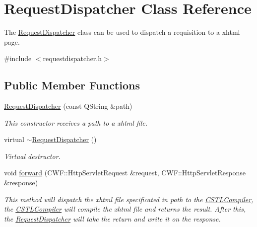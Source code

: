 \hypertarget{class_request_dispatcher}{}\section{Request\+Dispatcher Class Reference}
\label{class_request_dispatcher}


The \mbox{\hyperlink{class_request_dispatcher}{Request\+Dispatcher}} class can be used to dispatch a requisition to a xhtml page.  




{\ttfamily \#include $<$requestdispatcher.\+h$>$}

\subsection*{Public Member Functions}
\begin{DoxyCompactItemize}
\item 
\mbox{\hyperlink{class_request_dispatcher_accb486106fd9d814d44222594a174fbb}{Request\+Dispatcher}} (const Q\+String \&path)
\begin{DoxyCompactList}\small\item\em This constructor receives a path to a xhtml file. \end{DoxyCompactList}\item 
\mbox{\label{class_request_dispatcher_a1b09805ab31a0f96d9823a2bf9de3771}} 
virtual \mbox{\hyperlink{class_request_dispatcher_a1b09805ab31a0f96d9823a2bf9de3771}{$\sim$\+Request\+Dispatcher}} ()
\begin{DoxyCompactList}\small\item\em Virtual destructor. \end{DoxyCompactList}\item 
void \mbox{\hyperlink{class_request_dispatcher_aa3ccc7d3debc6555da0f6e437cfb036e}{forward}} (C\+W\+F\+::\+Http\+Servlet\+Request \&request, C\+W\+F\+::\+Http\+Servlet\+Response \&response)
\begin{DoxyCompactList}\small\item\em This method will dispatch the xhtml file specificated in path to the \mbox{\hyperlink{class_c_s_t_l_compiler}{C\+S\+T\+L\+Compiler}}, the \mbox{\hyperlink{class_c_s_t_l_compiler}{C\+S\+T\+L\+Compiler}} will compile the xhtml file and returns the result. After this, the \mbox{\hyperlink{class_request_dispatcher}{Request\+Dispatcher}} will take the return and write it on the response. \end{DoxyCompactList}\end{DoxyCompactItemize}


